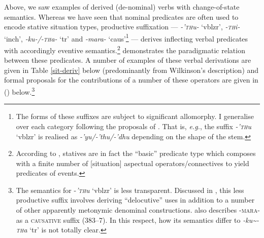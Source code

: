 


Above, we saw examples of derived (de-nominal) verbs with change-of-state semantics. Whereas we have seen that nominal predicates are often used to encode stative situation types, productive suffixation --- \textit{-’\textsc{th}u-} `\gls{vblzr}', \textit{-\textsc{th}i-} `\gls{inch}', \textit{-ku-/-\textsc{th}a-} `\gls{tr}' and \textit{-mara-} `\gls{caus}'\footnote{The forms of these  suffixes are subject to significant allomorphy. I generalise over each category following the proposals of \citet[§ 7.5]{Wilkinson1991}. That is, \textit{e.g.}, the suffix \textit{-’\textsc{th}u} `\gls{vblzr}' is realised as \textit{-’yu/-’thu/-’dhu} depending on the shape of the stem.} --- derives inflecting verbal predicates with accordingly eventive semantics.\footnote{According to \citet{Dowty1972,Dowty1979}, statives are in fact the ``basic'' predicate type which composes with a finite number of [situation] aspectual operators/connectives to yield predicates of events.} \citet{Wilkinson1991} demonstrates the paradigmatic relation between these predicates. A number of examples of these verbal derivations are given in Table \ref{sit-deriv} below (predominantly from Wilkinson's description) and formal proposals for the contributions of a number of these operators are given in (\nextx) below.\footnote{The semantics for -\textit{\textsc{'th}u} `\gls{vblzr}' is less transparent. Discussed in \citet[375--9]{Wilkinson1991}, this less productive suffix involves deriving ``delocutive'' uses in addition to a number of other apparently metonymic denominal constructions. \citeauthor{Wilkinson1991} also describes \textsc{-mara-} as a \textsc{causative} suffix (383--7). In this respect, how its semantics differ to \textit{-ku\textasciitilde-\textsc{th}a} `\gls{tr}' is not totally clear.}


